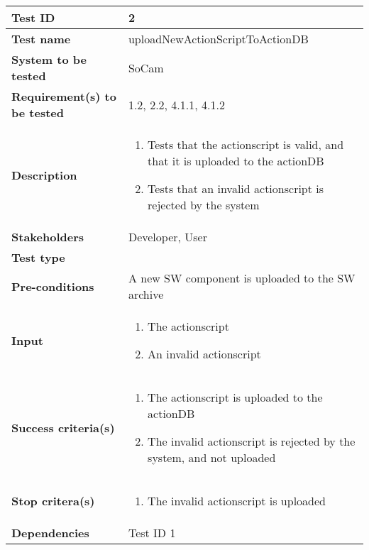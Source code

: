 		\begin{table}[H]
			\begin{tabular}{| p{4cm} | p{10cm} |}
			\hline
			\rowcolor{gray}
				{\bf Test ID} & 2 \\ \hline
				{\bf Test name} & uploadNewActionScriptToActionDB \\ \hline
				{\bf System to be tested} & SoCam\\ \hline
				{\bf Requirement(s) to be tested} & 1.2, 2.2, 4.1.1, 4.1.2 \\ \hline
				{\bf Description} & 
					\begin{enumerate}
						\item Tests that the actionscript is valid, and that it is 
						uploaded to the actionDB
						\item Tests that an invalid actionscript is rejected by the system
					\end{enumerate}
				\\ \hline
				{\bf Stakeholders} & Developer, User \\ \hline
				{\bf Test type} & \\ \hline
				{\bf Pre-conditions} & A new SW component is uploaded to the SW archive \\ \hline
				{\bf Input} & 
					\begin{enumerate}
						\item The actionscript
						\item An invalid actionscript
					\end{enumerate}
				\\ \hline
				{\bf Success criteria(s)} & 
					\begin{enumerate}
						\item The actionscript is uploaded to the actionDB
						\item The invalid actionscript is rejected by the system, and not uploaded
					\end{enumerate}
				\\ \hline
				{\bf Stop critera(s)} &  
					\begin{enumerate}
						\item The invalid actionscript is uploaded
					\end{enumerate} \\ \hline
				{\bf Dependencies} & Test ID 1 \\ \hline
			\end{tabular}
		\end{table}

